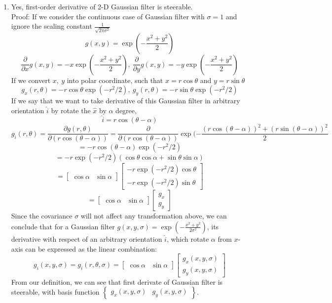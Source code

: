 \documentclass[12pt]{article}
\begin{document}
\begin{enumerate}
\begin{enumerate}
	\item Yes, first-order derivative of 2-D Gaussian filter is steerable.\\
	Proof: If we consider the continuous case of Gaussian filter with $\sigma =1$ and ignore the scaling constant $\frac{1}{\sqrt{2\pi\sigma^2}}$
	$$g(x,y) = \exp(-\frac{x^2+y^2}{2})$$
	$$\frac{\partial}{\partial x}g(x,y) = -x\exp(-\frac{x^2+y^2}{2}),~\frac{\partial}{\partial y}g(x,y) = -y\exp(-\frac{x^2+y^2}{2})$$
	If we convert $x,~y$ into polar coordinate, such that $x=r\cos\theta$ and $y=r\sin\theta$
	$$g_x(r,\theta) = -r\cos\theta\exp(-r^2/2),~g_y(r,\theta)=-r\sin\theta\exp(-r^2/2)$$
	If we say that we want to take derivative of this Gaussian filter in arbitrary orientation $\hat{i}$ by rotate the $\hat{x}$ by $\alpha$ degree,
	$$\hat{i} = r\cos(\theta-\alpha)$$  
	$$g_{\hat{i}}(r,\theta) =\frac{\partial g(r,\theta)}{\partial (r\cos(\theta-\alpha))}=\frac{\partial}{\partial (r\cos(\theta-\alpha))}\exp(-\frac{(r\cos(\theta-\alpha))^2+(r\sin(\theta-\alpha))^2}{2}$$ $$=-r\cos(\theta-\alpha)\exp(-r^2/2)$$
	$$=-r\exp(-r^2/2)(\cos\theta\cos\alpha+\sin\theta\sin\alpha)$$
	$$=\begin{bmatrix}
	\cos\alpha& \sin\alpha
	\end{bmatrix}\begin{bmatrix}
	-r\exp(-r^2/2)\cos\theta\\
	-r\exp(-r^2/2)\sin\theta
	\end{bmatrix}$$
	$$=\begin{bmatrix}
	\cos\alpha& \sin\alpha
	\end{bmatrix}\begin{bmatrix}
	g_x\\
	g_y
	\end{bmatrix}$$
	Since the covariance $\sigma$ will not affect any transformation above, we can conclude that for a Gaussian filter $g(x,y,\sigma)=\exp(-\frac{x^2+y^2}{2\sigma^2})$, its derivative with respect of an arbitrary orientation $\hat{i}$, which rotate $\alpha$ from $x$-axis can be expressed as the linear combination:
	$$g_i(x,y,\sigma) = g_i(r,\theta,\sigma)=\begin{bmatrix}
	\cos\alpha& \sin\alpha
	\end{bmatrix}\begin{bmatrix}
	g_x(x,y,\sigma)\\
	g_y(x,y,\sigma)
	\end{bmatrix}$$
	From our definition, we can see that first derivate of Gaussian filter is steerable, with basis function $\begin{Bmatrix}
	g_x(x,y,\sigma)&
	g_y(x,y,\sigma)
	\end{Bmatrix}$. \\
	

\end{enumerate}
\end{enumerate}
\end{document}
